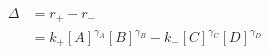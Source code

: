 \begin{eqnarray}\label{eqn:flux-def}
\Delta  & =r_+-r_- \\
&=  k_+[A]^{\gamma_A}[B]^{\gamma_B} -  k_-[C]^{\gamma_C}[D]^{\gamma_D} \\
\end{eqnarray}